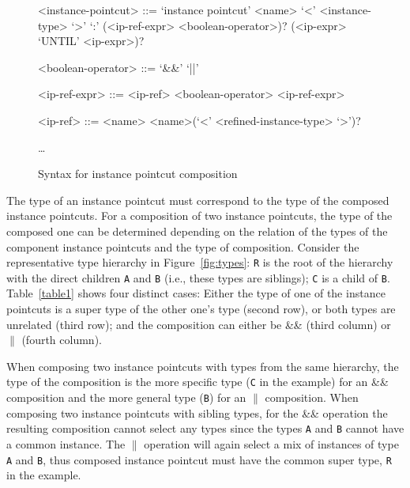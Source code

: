 \documentclass{acm_proc_article-sp}
\begin{document}
\begin{figure}[h]
\begin{grammar}
<instance-pointcut> ::= `instance pointcut' <name> `<' <instance-type> `>' `:'
(<ip-ref-expr> <boolean-operator>)? (<ip-expr> `UNTIL' <ip-expr>)? 

<boolean-operator> ::= `&&' \alt `||'

<ip-ref-expr> ::= <ip-ref>  <boolean-operator> <ip-ref-expr> 

<ip-ref> ::= <name> \alt <name>(`<' <refined-instance-type> `>')?

\ldots
\end{grammar}
\caption{Syntax for instance pointcut composition}
\label{fig:grammar2}
\end{figure}


The type of an instance pointcut must correspond to the type of the composed instance pointcuts. For a composition of two instance pointcuts, the type of the composed one can be determined depending on the relation of the types of the component instance pointcuts and the type of composition. Consider the representative type hierarchy in Figure~\ref{fig:types}: \texttt{R} is the root of the hierarchy with the direct children \texttt{A} and \texttt{B} (i.e., these types are siblings); \texttt{C} is a child of \texttt{B}. Table~\ref{table1} shows four distinct cases: Either the type of one of the instance pointcuts is a super type of the other one's type (second row), or both types are unrelated (third row); and the composition can either be \&\& (third column) or $\|$ (fourth column).

When composing two instance pointcuts with types from the same hierarchy, the type of the composition is the more specific type (\texttt{C} in the example) for an \&\& composition and the more general type (\texttt{B}) for an $\|$ composition.
When composing two instance pointcuts with sibling types, for the \&\& operation the resulting composition cannot select any types since the types \texttt{A} and \texttt{B} cannot have a common instance. The $\|$ operation will again select a mix of instances of type \texttt{A} and \texttt{B}, thus composed instance pointcut must have the common super type, \texttt{R} in the example.
\end{document}
